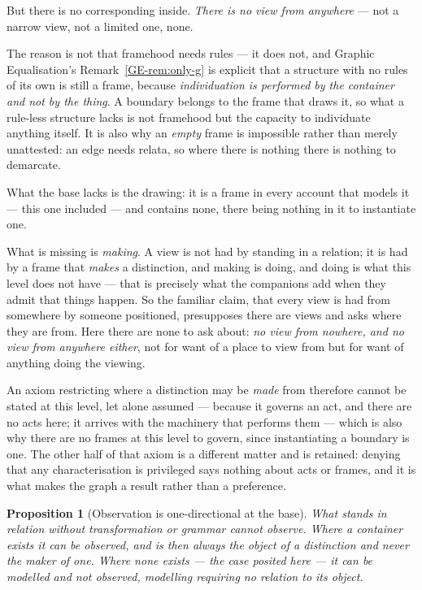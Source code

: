 \documentclass[11pt,a4paper]{article}
\newtheorem{proposition}{Proposition}
\begin{document}
But there is no corresponding inside. \emph{There is no view from anywhere} --- not a narrow
view, not a limited one, none.

The reason is not that framehood needs rules --- it does not, and Graphic Equalisation's
Remark~\ref{GE-rem:only-g} is explicit that a structure with no rules of its own is still a frame,
because \emph{individuation is performed by the container and not by the thing}. A boundary belongs to the frame that draws it, so what a rule-less
structure lacks is not framehood but the capacity to individuate anything itself. It is also why an
\emph{empty} frame is impossible rather than merely unattested: an edge needs relata, so where there is
nothing there is nothing to demarcate.

What the base lacks is the drawing: it is a frame in every account that models it --- this one
included --- and contains none, there being nothing in it to instantiate one.

What is missing is \emph{making}. A view is not had by standing in a relation; it is had by a frame
that \emph{makes} a distinction, and making is doing, and doing is what this level does not have ---
that is precisely what the companions add when they admit that things happen. So the familiar claim,
that every view is had from somewhere by someone positioned, presupposes there are views and asks where
they are from. Here there are none to ask about: \emph{no view from nowhere, and no view from anywhere
either}, not for want of a place to view from but for want of anything doing the viewing.

An axiom restricting where a distinction may be \emph{made} from therefore cannot be stated at this
level, let alone assumed --- because it governs an act, and there are no acts here; it arrives with the
machinery that performs them --- which is also why there are no frames at this level to govern, since
instantiating a boundary is one. The other half of that axiom is a different matter and is retained:
denying that any characterisation is privileged says nothing about acts or frames, and it is what makes
the graph a result rather than a preference.

\begin{proposition}[Observation is one-directional at the base]\label{prop:one-way}
What stands in relation without transformation or grammar cannot observe. Where a container exists it
can be observed, and is then always the object of a distinction and never the maker of one. Where none
exists --- the case posited here --- \emph{it can be modelled and not observed}, modelling requiring no
relation to its object.
\end{proposition}
\end{document}

